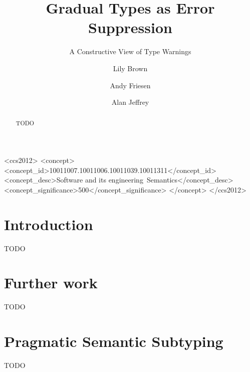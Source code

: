 \documentclass[acmsmall,review,screen]{acmart}
\begin{document}
\title{Gradual Types as Error Suppression}
\subtitle{A Constructive View of Type Warnings}

\author{Lily Brown}
\author{Andy Friesen}
\author{Alan Jeffrey}

\begin{abstract}
  TODO
\end{abstract}

\begin{CCSXML}
<ccs2012>
<concept>
<concept_id>10011007.10011006.10011039.10011311</concept_id>
<concept_desc>Software and its engineering~Semantics</concept_desc>
<concept_significance>500</concept_significance>
</concept>
</ccs2012>
\end{CCSXML}

\maketitle

\section{Introduction}

TODO

\section{Further work}

TODO

\appendix

\section{Pragmatic Semantic Subtyping}

TODO



\end{document}

